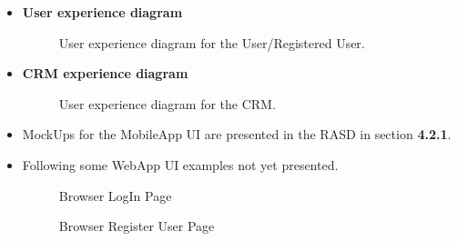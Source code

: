 \documentclass[a4paper]{article}
\begin{document}
\begin {itemize}
\item \textbf{User experience diagram}
\begin{figure}[h]
\centering
\vspace*{\fill}
\noindent{}%
\caption {User experience diagram for the User/Registered User.}
\vspace*{0.2cm}
\end{figure}
\newpage
\item \textbf{CRM experience diagram}
\begin{figure}[h]
\centering
\vspace*{\fill}
\noindent{}%
\caption {User experience diagram for the CRM.}
\vspace*{0.2cm}
\end{figure}
\pagebreak
\item MockUps for the MobileApp UI are presented in the RASD in section \textbf{4.2.1}. 
\item Following some WebApp UI examples not yet presented.
\begin{figure}[h]
\centering
\vspace*{\fill}
\noindent{}%
\caption {Browser LogIn Page}
\vspace*{0.2cm}
\end{figure}
\begin{figure}[h]
\centering
\vspace*{\fill}
\noindent{}%
\caption {Browser Register User Page}
\vspace*{0.2cm}
\end{figure}
\end{itemize}
\end{document}
